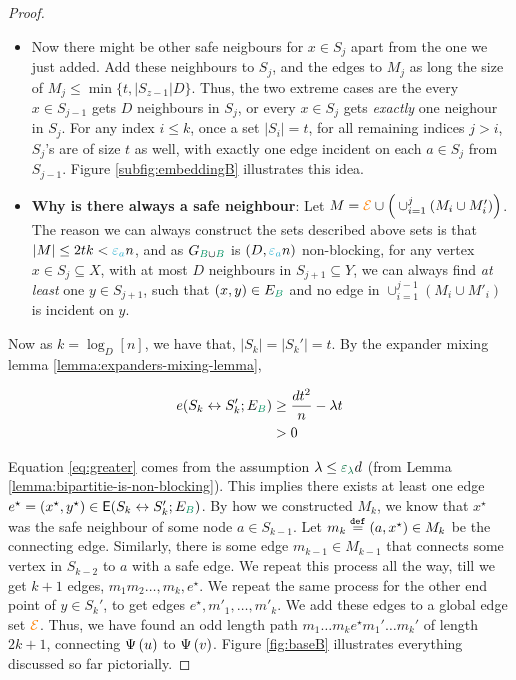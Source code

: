 \documentclass[11pt]{article}
\begin{document}
\begin{proof}
\begin{itemize}
\item{Now there might be other safe neigbours for $x \in S_j$ apart from the one we just added. Add these neighbours to $S_j$, and the edges to $M_j$ as long the size of $M_j \leq \min\{t, |S_{z-1}|D\}$.
    Thus, the two extreme cases are the every $x \in S_{j-1}$ gets $D$ neighbours in $S_j$, or every $x \in S_{j}$ gets \emph{exactly} one neighour in $S_j$.
For any index $i \leq k$, once a set $|S_i|=t$, for all remaining indices $j > i$, $S_j$'s are of size $t$ as well, with exactly one edge incident on each $a \in S_j$ from $S_{j-1}$. Figure \ref{subfig:embeddingB} illustrates this idea.
  }

\item{\textbf{Why is there always a safe neighbour}: Let $M = \textcolor{orange}{\mathcal{E}} \cup \Big(\cup_{i=1}^{j} (M_i \cup M'_i)\Big)$.
The reason we can always construct the sets described above sets is that $|M| \leq 2tk < \epsilonA n$, and as $\BipartiteG$ is $(D, \epsilonA n)$ non-blocking, for any vertex $x \in S_j \subseteq X$, with at most $D$ neighbours in $S_{j+1} \subseteq Y$, we can always find \emph{at least} one $y \in S_{j+1}$, such that $(x,y) \in E_{\GreenB}$ and no edge in $\cup_{i=1}^{j-1} (M_i \cup M'_i)$ is incident on $y$.}  


\end{itemize}



Now as $k = \log_D[n]$, we have that, $|S_k| = |S_k'|= t$.
By the expander mixing lemma \ref{lemma:expanders-mixing-lemma},

\begin{align}
\CutEdges{S_k}{S_k'}{E_{\GreenB}}
 &\geq \frac{d t^2}{n} - \lambda t \\
	&> 0 \label{eq:greater}
\end{align}

Equation \eqref{eq:greater} comes from the assumption $\lambda \leq \epsilonL d$ (from Lemma \ref{lemma:bipartitie-is-non-blocking}).
This implies there exists at least one edge $e^\star=(x^\star,y^\star) \in \CutEdgesSet{S_k}{S_k'}{E_{\GreenB}}$.
By how we constructed $M_k$, we know that $x^\star$ was the safe neighbour of some node $a \in S_{k-1}$.
Let $m_k \text{}\overset{\mathtt{def}}{=} (a,x^\star) \in M_k$ be the connecting edge.
Similarly, there is some edge $m_{k-1} \in M_{k-1}$ that connects some vertex in $S_{k-2}$ to $a$ with a safe edge.
We repeat this process all the way, till we get $k+1$ edges, $m_1 m_2 \dots, m_k, e^\star$.
We repeat the same process for the other end point of $y \in S_k'$, to get edges $e^\star, m'_1, \dots, m'_k$.
We add these edges to a global edge set $\textcolor{orange}{\mathcal{E}}$.
Thus, we have found an odd length path $m_1\dots m_k e^\star m_1'\dots m_k'$ of length $2k+1$, connecting $\Psi\left(u\right)$ to $\Psi\left(v\right)$.
 Figure \ref{fig:baseB} illustrates everything discussed so far pictorially.


\end{proof}
\end{document}
